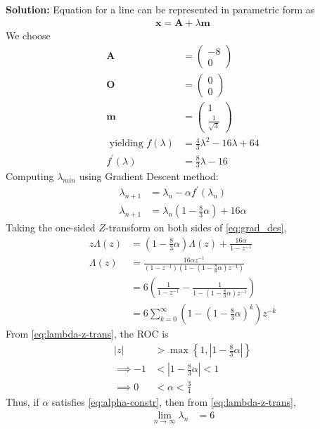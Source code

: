 \documentclass[12pt]{article}
\providecommand{\brak}[1]{\ensuremath{\left(#1\right)}}
\providecommand{\cbrak}[1]{\ensuremath{\left\{#1\right\}}}
\providecommand{\abs}[1]{\left\vert#1\right\vert}
\newcommand{\solution}{\noindent \textbf{Solution: }}
\newcommand{\myvec}[1]{\ensuremath{\begin{pmatrix}#1\end{pmatrix}}}
\let\vec\mathbf
\begin{document}
\begin{enumerate}
\solution 
Equation for a line  can be represented in parametric form as
\begin{align}
	\label{eq:Eq2}
	\vec{x} = \vec{A}+\lambda\vec{m}
\end{align}
We choose  
\begin{align}
	\vec{A} &= \myvec{-8 \\ 0}\\
	\vec{O} &= \myvec{ 0 \\ 0} \\
	\vec{m} &= \myvec{1 \\ \frac{1}{\sqrt{3}}} \\
	\text{ yielding }\label{eq:Eq6}
	f\brak{\lambda} &= \frac{4}{3}\lambda^2-16\lambda+64 \\ 
	f^\prime\brak{\lambda} &= \frac{8}{3}\lambda - 16
\end{align}
Computing $\lambda_{min}$ using Gradient Descent method:
\begin{align}
	\lambda_{n+1} &= \lambda_n - \alpha f^\prime\brak{\lambda_n}\\
	\label{eq:grad_des}
	\lambda_{n+1} &= \lambda_n\brak{1-\frac{8}{3}\alpha} + 16\alpha
\end{align}
Taking the one-sided $Z$-transform on both sides of \eqref{eq:grad_des},
\begin{align}
            \label{eq:Z-trans-eqn}
	    z\Lambda\brak{z} &= \brak{1-\frac{8}{3}\alpha}\Lambda\brak{z} + \frac{16\alpha}{1-z^{-1}} \\
	    \Lambda\brak{z} &= \frac{16\alpha z^{-1}}{\brak{1-z^{-1}}\brak{1-\brak{1-\frac{8}{8}\alpha}z^{-1}}} \\
	    &= 6\brak{ \frac{1}{1-z^{-1}} - \frac{1}{1-\brak{1-\frac{8}{3}\alpha}z^{-1}}} \\
            \label{eq:lambda-z-trans}
	    &= 6\sum_{k=0}^{\infty}\brak{1-\brak{1-\frac{8}{3}\alpha}^k}z^{-k}
\end{align}
From \eqref{eq:lambda-z-trans}, the ROC is
\begin{align}
	\abs{z} &> \max\cbrak{1,\abs{1-\frac{8}{3}\alpha}} \\
	\implies -1 & < \abs{1-\frac{8}{3}\alpha} < 1 \\
        \label{eq:alpha-constr}
        \implies 0 &< \alpha < \frac{3}{4}
\end{align}
Thus, if $\alpha$ satisfies \eqref{eq:alpha-constr}, then from \eqref{eq:lambda-z-trans}, 
\begin{align}
	\label{eq:conv}
        \lim_{n\to\infty}\lambda_n &= 6 
    \end{align}

\end{enumerate}
\end{document}
